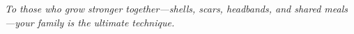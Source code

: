 \cleardoublepage
\begingroup
  \hypersetup{pageanchor=false}%
  \thispagestyle{empty}
  \vspace*{\fill}
  \begin{center}\itshape
  To those who grow stronger together—shells, scars, headbands, and shared meals—your family is the ultimate technique.
  \end{center}
  \vspace*{\fill}
  \clearpage
\endgroup